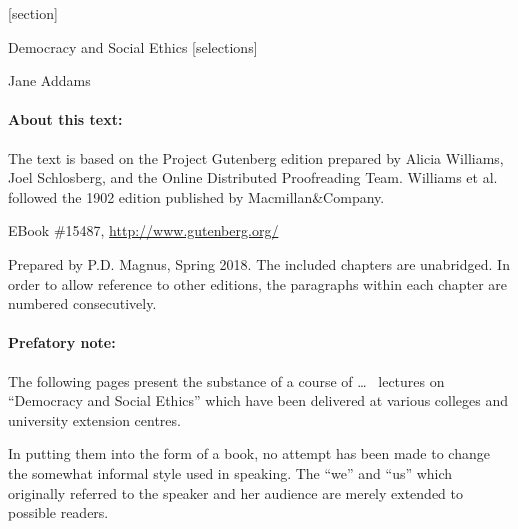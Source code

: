 \documentclass[]{article}
\newcommand*{\authortitle}[1]{\medskip\centerline{\Huge\sc #1}\bigskip}
\newcommand*{\itemtitle}[1]{\setstretch{1.8}\pagebreak[2]\begin{center}{\LARGE\sc #1}\end{center}\setstretch{1.2}}
\begin{document}
[section]
\newcommand*{\addamsparagraph}{\stepcounter{addamsparagraph}\paragraph{\small\P\arabic{addamsparagraph}}}


\newenvironment{sectionbody}{\begin{multicols}{2}%
}{\end{multicols}}


\itemtitle{Democracy and Social Ethics [selections]}

\authortitle{Jane Addams}


\paragraph{About this text:} The text is based on the Project Gutenberg edition prepared by Alicia Williams, Joel Schlosberg, and the Online Distributed Proofreading Team. Williams et al. followed the 1902 edition published by Macmillan\&Company.

EBook \#15487, \url{http://www.gutenberg.org/}

Prepared by P.D. Magnus, Spring 2018. The included chapters are unabridged. In order to allow reference to other editions, the paragraphs within each chapter are numbered consecutively.



\setcounter{tocdepth}{1}
\tableofcontents

\pagestyle{fancy}
\lfoot{\thepage}
\cfoot{}


\bigskip


\paragraph{Prefatory note:} The following pages present the substance of a course of \ldots\ %
lectures on ``Democracy and Social Ethics'' which have been delivered at various colleges and university extension centres.

In putting them into the form of a book, no attempt has been made to change the somewhat informal style used in speaking. The ``we'' and ``us'' which originally referred to the speaker and her audience are merely extended to possible readers.
\end{document}
